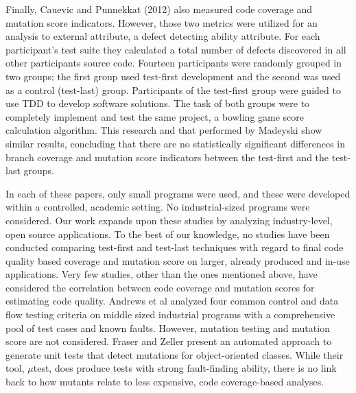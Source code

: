 \documentclass[conference]{IEEEtran}
\begin{document}
Finally, Cauevic and Punnekkat \cite{cauevic2012quality} (2012) also measured code coverage and  mutation score indicators. However, those two metrics were utilized for an analysis to external attribute, a defect detecting ability attribute. For each participant's test suite they calculated a total number of defects discovered in all other participants source code. Fourteen participants were randomly grouped in two groups; the first group used test-first development and the second was used as a control (test-last) group. Participants of the test-first group were guided to use TDD to develop software solutions. The task of both groups were to completely implement and test the same project, a bowling game score calculation algorithm. This research and that performed by Madeyski \cite{madeyski2010impact} show similar results, concluding that there are no statistically significant differences in branch coverage and mutation score indicators between the test-first and the test-last groups.  

In each of these papers, only small programs were used, and these were developed within a controlled, academic setting. No industrial-sized programs were considered. Our work expands upon these studies by analyzing industry-level, open source applications. To the best of our knowledge, no studies have been conducted comparing test-first and test-last techniques with regard to final code quality based coverage and mutation score on larger, already produced and in-use applications.
Very few studies, other than the ones mentioned above, have considered the correlation between code coverage and mutation scores for estimating code quality. Andrews et al \cite{andrews2006using} analyzed four common control and data flow testing criteria on middle sized industrial programs with a comprehensive pool of test cases and known faults. However, mutation testing and mutation score are not considered. Fraser and Zeller \cite{fraser2012mutation} present an automated approach to generate unit tests that detect mutations for object-oriented classes. While their tool, $\mu$test, does produce tests with strong fault-finding ability, there is no link back to how mutants relate to less expensive, code coverage-based analyses. 
\end{document}
